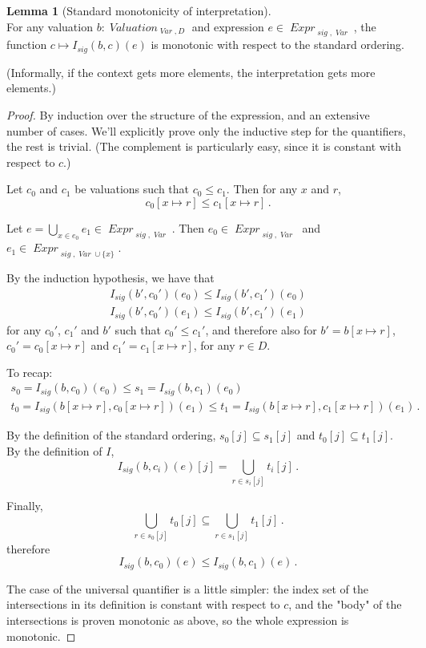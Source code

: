 \documentclass[oneside,12pt]{book}
\theoremstyle{definition}
\newtheorem{lemma}[theorem]{Lemma}
\theoremstyle{remark}
\newcommand\var[1]{\mathop{\mathit{#1}}\nolimits}
\newcommand{\sig}{\var{sig}}
\newcommand{\Var}{\var{Var}}
\newcommand{\Valuation}{\var{Valuation}}
\newcommand{\Expr}{\var{Expr}}
\begin{document}
\begin{lemma}[Standard monotonicity of interpretation]\label{monoInterpStd} \hfill \\
  For any valuation $b\colon \Valuation_{\Var,D}$ and expression
  $e \in \Expr_{\sig,\Var}$, the function $c \mapsto I_{\sig}(b, c)(e)$
  is monotonic with respect to the standard ordering.
  
  (Informally, if the context gets more elements, the interpretation
  gets more elements.)
\end{lemma}
\begin{proof}
  By induction over the structure of the expression, and an extensive number
  of cases. We'll explicitly prove only the inductive step for the quantifiers,
  the rest is trivial. (The complement is particularly easy,
  since it is constant with respect to $c$.)
  
  Let $c_0$ and $c_1$ be valuations such that $c_0 \leq c_1$. Then for any
  $x$ and $r$, \[c_0[x {\mapsto} r] \leq c_1[x {\mapsto} r]\,.\]
  
  Let $e = \displaystyle\bigcup_{x \in e_0}e_1 \in \Expr_{\sig,\Var}$.
  Then $e_0 \in \Expr_{\sig,\Var}$ and $e_1 \in \Expr_{\sig,\Var\cup\{x\}}$.
  
  By the induction hypothesis, we have that
  \begin{align*}
    I_{\sig}(b', c_0')(e_0) \leq I_{\sig}(b', c_1')(e_0) \\
    I_{\sig}(b', c_0')(e_1) \leq I_{\sig}(b', c_1')(e_1)
  \end{align*}
  for any $c_0'$, $c_1'$ and $b'$ such that $c_0' \leq c_1'$, and therefore also
  for $b' = b[x {\mapsto} r]$, $c_0' = c_0[x {\mapsto} r]$
  and $c_1' = c_1[x {\mapsto} r]$, for any $r \in D$.
  
  To recap:
  \begin{gather*}
    s_0 = I_{\sig}(b, c_0)(e_0) \leq s_1 = I_{\sig}(b, c_1)(e_0) \\
    t_0 = I_{\sig}(b[x {\mapsto} r], c_0[x {\mapsto} r])(e_1)
      \leq t_1 =  I_{\sig}(b[x {\mapsto} r], c_1[x {\mapsto} r])(e_1)\,.
  \end{gather*}
  
  By the definition of the standard ordering, $s_0[j] \subseteq s_1[j]$
  and $t_0[j] \subseteq t_1[j]$. By the definition of $I$,
  \[I_{\sig}(b, c_i)(e)[j] = \bigcup_{r \in s_i[j]}t_i[j]\,.\]
  
  Finally, \[\bigcup_{r \in s_0[j]}t_0[j] \subseteq \bigcup_{r \in s_1[j]}t_1[j]\,.\]
  therefore \[I_{\sig}(b, c_0)(e) \leq I_{\sig}(b, c_1)(e)\,.\]
  
  \noindent %
  The case of the universal quantifier is a little simpler: the index set of the
  intersections in its definition is constant with respect to $c$, and the
  "body" of the intersections is proven monotonic as above, so the whole
  expression is monotonic.
\end{proof}
\end{document}
